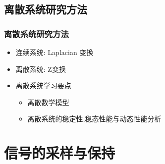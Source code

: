 \documentclass[table]{article}
\begin{document}
\subsection{离散系统研究方法}
\label{sec-1-4}
\begin{frame}
\frametitle{离散系统研究方法}
\label{sec-1-4-1}

\begin{itemize}
\item 连续系统: Laplacian 变换
\item <2->离散系统: Z变换
\item <3->离散系统学习要点
\begin{itemize}
\item <4->离散数学模型
\item <5->离散系统的稳定性,稳态性能与动态性能分析
\end{itemize}
\end{itemize}
\end{frame}
\section{信号的采样与保持}
\label{sec-2}






\end{document}
